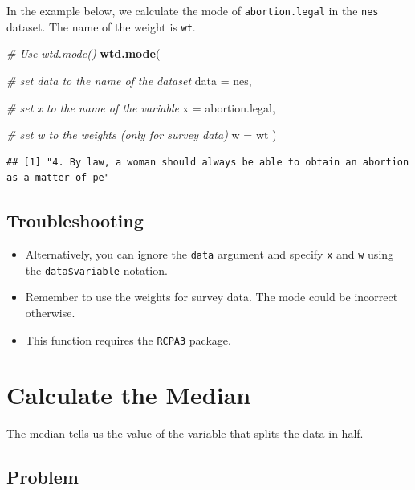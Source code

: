 \documentclass[
]{book}
\newenvironment{Shaded}{\begin{snugshade}}{\end{snugshade}}
\newcommand{\AttributeTok}[1]{\textcolor[rgb]{0.13,0.29,0.53}{#1}}
\newcommand{\CommentTok}[1]{\textcolor[rgb]{0.56,0.35,0.01}{\textit{#1}}}
\newcommand{\FunctionTok}[1]{\textcolor[rgb]{0.13,0.29,0.53}{\textbf{#1}}}
\newcommand{\NormalTok}[1]{#1}
\providecommand{\tightlist}{%
  \setlength{\itemsep}{0pt}\setlength{\parskip}{0pt}}
\begin{document}
In the example below, we calculate the mode of \texttt{abortion.legal} in the \texttt{nes} dataset. The name of the weight is \texttt{wt}.

\begin{Shaded}
\begin{Highlighting}[]
\CommentTok{\# Use \textasciigrave{}wtd.mode()\textasciigrave{}}
\FunctionTok{wtd.mode}\NormalTok{(}
  
  \CommentTok{\# set data to the name of the dataset}
  \AttributeTok{data =}\NormalTok{ nes,}
  
  \CommentTok{\# set x to the name of the variable}
  \AttributeTok{x =}\NormalTok{ abortion.legal,}
  
  \CommentTok{\# set w to the weights (only for survey data)}
  \AttributeTok{w =}\NormalTok{ wt}
\NormalTok{)}
\end{Highlighting}
\end{Shaded}

\begin{verbatim}
## [1] "4. By law, a woman should always be able to obtain an abortion as a matter of pe"
\end{verbatim}

\hypertarget{troubleshooting-27}{%
\subsection{Troubleshooting}\label{troubleshooting-27}}

\begin{itemize}
\tightlist
\item
  Alternatively, you can ignore the \texttt{data} argument and specify \texttt{x} and \texttt{w} using the \texttt{data\$variable} notation.
\item
  Remember to use the weights for survey data. The mode could be incorrect otherwise.
\item
  This function requires the \texttt{RCPA3} package.
\end{itemize}

\hypertarget{median}{%
\section{Calculate the Median}\label{median}}

The median tells us the value of the variable that splits the data in half.

\hypertarget{problem-32}{%
\subsection{Problem}\label{problem-32}}
\end{document}
